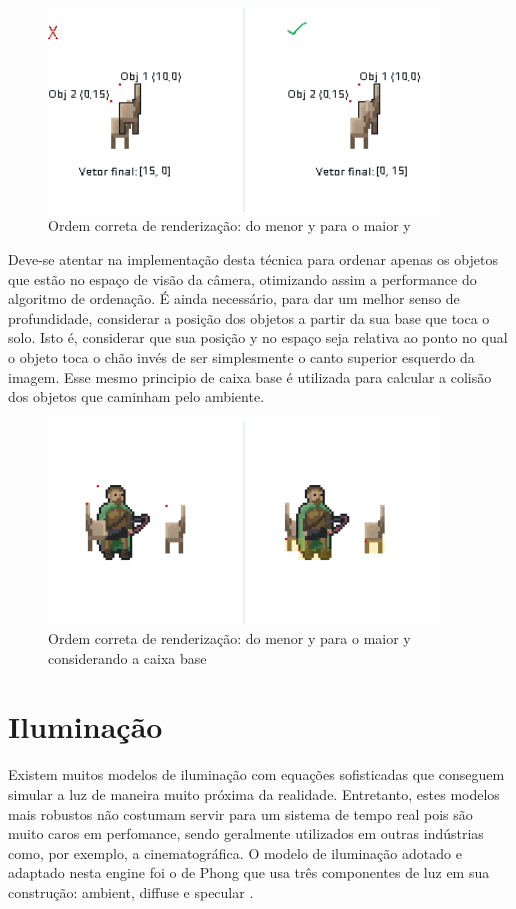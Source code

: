 \documentclass[12pt, 
openright, 
oneside, 
a4paper,    
brazil]{facom-ufu-abntex2}
\begin{document}
\begin{figure}[H]
	\centering
	\includegraphics[width=28em]{imagens/z-order.png}
	\caption{Ordem correta de renderização: do menor y para o maior y}
\end{figure}

Deve-se atentar na implementação desta técnica para ordenar apenas os objetos que estão no espaço de visão da câmera, otimizando assim a performance do algoritmo de ordenação. É ainda necessário, para dar um melhor senso de profundidade, considerar a posição dos objetos a partir da sua base que toca o solo. Isto é, considerar que sua posição y no espaço seja relativa ao ponto no qual o objeto toca o chão invés de ser simplesmente o canto superior esquerdo da imagem. Esse mesmo principio de caixa base é utilizada para calcular a colisão dos objetos que caminham pelo ambiente.


\begin{figure}[H]
	\centering
	\includegraphics[width=28em]{imagens/zOrderWithBaseBox.png}
	\caption{Ordem correta de renderização: do menor y para o maior y considerando a caixa base}
\end{figure}



\section{Iluminação}
Existem muitos modelos de iluminação com equações sofisticadas que conseguem simular a luz de maneira muito próxima da realidade. Entretanto, estes modelos mais robustos não costumam servir para um sistema de tempo real pois são muito caros em perfomance, sendo geralmente utilizados em outras indústrias como, por exemplo, a cinematográfica.
O modelo de iluminação adotado e adaptado nesta engine foi o de Phong que usa três componentes de luz em sua construção: ambient, diffuse e specular \cite{PhongShading}.
\end{document}
